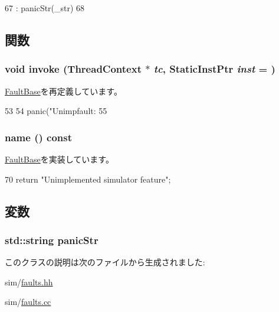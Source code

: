 \begin{DoxyCode}
67         : panicStr(_str)
68     { }
\end{DoxyCode}


\subsection{関数}
\hypertarget{classUnimpFault_a2bd783b42262278d41157d428e1f8d6f}{
\subsubsection[{invoke}]{\setlength{\rightskip}{0pt plus 5cm}void invoke ({\bf ThreadContext} $\ast$ {\em tc}, \/  {\bf StaticInstPtr} {\em inst} = {})}}
\label{classUnimpFault_a2bd783b42262278d41157d428e1f8d6f}


\hyperlink{classFaultBase_a2bd783b42262278d41157d428e1f8d6f}{FaultBase}を再定義しています。


\begin{DoxyCode}
53 {
54     panic("Unimpfault: %
55 }
\end{DoxyCode}
\hypertarget{classUnimpFault_a73adb23259baf912a81683a9790a303f}{
\subsubsection[{name}]{ name () const}}
\label{classUnimpFault_a73adb23259baf912a81683a9790a303f}


\hyperlink{classFaultBase_aad960357563b8b969d2dffdcc6861de7}{FaultBase}を実装しています。


\begin{DoxyCode}
70 {return "Unimplemented simulator feature";}
\end{DoxyCode}


\subsection{変数}
\hypertarget{classUnimpFault_ada384d45bbfeffe352f997821b8f6d2b}{
\subsubsection[{panicStr}]{\setlength{\rightskip}{0pt plus 5cm}std::string {\bf panicStr}}}
\label{classUnimpFault_ada384d45bbfeffe352f997821b8f6d2b}


このクラスの説明は次のファイルから生成されました:\begin{DoxyCompactItemize}
\item 
sim/\hyperlink{sim_2faults_8hh}{faults.hh}\item 
sim/\hyperlink{sim_2faults_8cc}{faults.cc}\end{DoxyCompactItemize}
